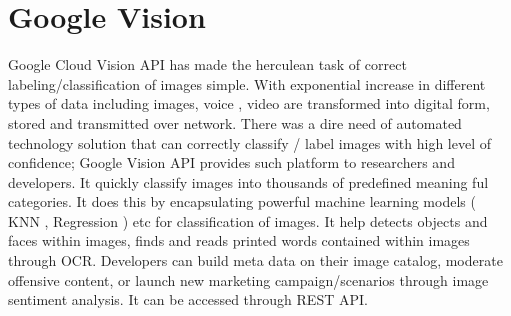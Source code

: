 \section{Google Vision}


Google Cloud Vision API has made the herculean task of correct labeling/classification of images simple. With exponential increase in different types of data including images, voice , video are transformed into digital form, stored and transmitted over network. There was a dire need of automated technology solution that can correctly classify / label images with high level of confidence; Google Vision API provides such platform to researchers and developers. It quickly classify images into thousands of predefined meaning ful categories\cite{www-google-vision}. It does this by encapsulating powerful machine learning models ( KNN , Regression ) etc for classification of images. \cite{www-google-vision}
It help detects objects and faces within images, finds and reads printed words contained within images through OCR\cite{www-google-vision}. Developers can build meta data on their image catalog, moderate offensive content, or launch new marketing campaign/scenarios through image sentiment analysis. It can be accessed through REST API. \cite{www-google-vision}
